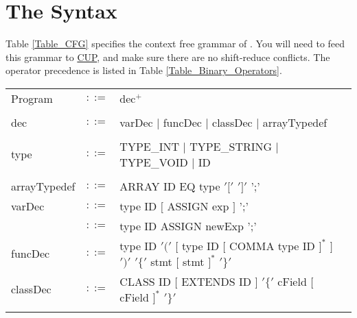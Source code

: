 \documentclass{article}
\begin{document}
\section{The \plname Syntax}
Table \ref{Table_CFG} specifies the context free grammar of \plname.
You will need to feed this grammar to \href{http://www2.cs.tum.edu/projects/cup/}{CUP},
and make sure there are no shift-reduce conflicts.
The operator precedence is listed in Table
\ref{Table_Binary_Operators}. 
\begin{table}[h]
\centering
\begin{tabular}{ l c l }
Program  & $::=$ & dec$^{+}$ \\
\\
dec      & $::=$ & varDec $|$ funcDec $|$ classDec $|$ arrayTypedef \\
\\
type      & $::=$ & TYPE\_INT $|$ TYPE\_STRING $|$ TYPE\_VOID $|$ ID \\
\\
arrayTypedef & $::=$ & ARRAY ID EQ type $'['$ $']'$ ';' \\
varDec   & $::=$ & type ID $[$ ASSIGN exp $]$ ';' \\
         & $::=$ & type ID ASSIGN newExp ';'      \\
funcDec  & $::=$ & type ID $'('$ $[$ type ID $[$ COMMA type ID $]^{*}$ $]$ $')'$ %
                   $'\{'$ stmt   $[$ stmt $]^{*}$ $'\}'$                 \\
classDec & $::=$ & CLASS ID $[$ EXTENDS ID $]$ $'\{'$ cField $[$ cField $]^{*}$ $'\}'$ \\
\\

\end{tabular}
\end{table}
\end{document}
